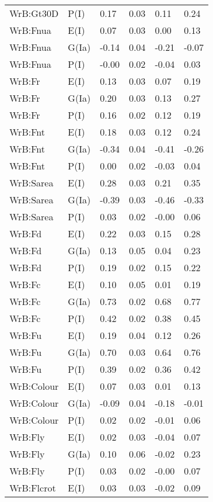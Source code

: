 \begin{center}
\begin{longtable}{|p{1.1in}|p{0.7in}|p{0.7in}|p{0.6in}|p{0.6in}|p{0.6in}|}
  WrB:Gt30D & P(I) & 0.17 & 0.03 & 0.11 & 0.24 \\ 
  WrB:Fnua & E(I) & 0.07 & 0.03 & 0.00 & 0.13 \\ 
  WrB:Fnua & G(Ia) & -0.14 & 0.04 & -0.21 & -0.07 \\ 
  WrB:Fnua & P(I) & -0.00 & 0.02 & -0.04 & 0.03 \\ 
  WrB:Fr & E(I) & 0.13 & 0.03 & 0.07 & 0.19 \\ 
  WrB:Fr & G(Ia) & 0.20 & 0.03 & 0.13 & 0.27 \\ 
  WrB:Fr & P(I) & 0.16 & 0.02 & 0.12 & 0.19 \\ 
  WrB:Fnt & E(I) & 0.18 & 0.03 & 0.12 & 0.24 \\ 
  WrB:Fnt & G(Ia) & -0.34 & 0.04 & -0.41 & -0.26 \\ 
  WrB:Fnt & P(I) & 0.00 & 0.02 & -0.03 & 0.04 \\ 
  WrB:Sarea & E(I) & 0.28 & 0.03 & 0.21 & 0.35 \\ 
  WrB:Sarea & G(Ia) & -0.39 & 0.03 & -0.46 & -0.33 \\ 
  WrB:Sarea & P(I) & 0.03 & 0.02 & -0.00 & 0.06 \\ 
  WrB:Fd & E(I) & 0.22 & 0.03 & 0.15 & 0.28 \\ 
  WrB:Fd & G(Ia) & 0.13 & 0.05 & 0.04 & 0.23 \\ 
  WrB:Fd & P(I) & 0.19 & 0.02 & 0.15 & 0.22 \\ 
  WrB:Fc & E(I) & 0.10 & 0.05 & 0.01 & 0.19 \\ 
  WrB:Fc & G(Ia) & 0.73 & 0.02 & 0.68 & 0.77 \\ 
  WrB:Fc & P(I) & 0.42 & 0.02 & 0.38 & 0.45 \\ 
  WrB:Fu & E(I) & 0.19 & 0.04 & 0.12 & 0.26 \\ 
  WrB:Fu & G(Ia) & 0.70 & 0.03 & 0.64 & 0.76 \\ 
  WrB:Fu & P(I) & 0.39 & 0.02 & 0.36 & 0.42 \\ 
  WrB:Colour & E(I) & 0.07 & 0.03 & 0.01 & 0.13 \\ 
  WrB:Colour & G(Ia) & -0.09 & 0.04 & -0.18 & -0.01 \\ 
  WrB:Colour & P(I) & 0.02 & 0.02 & -0.01 & 0.06 \\ 
  WrB:Fly & E(I) & 0.02 & 0.03 & -0.04 & 0.07 \\ 
  WrB:Fly & G(Ia) & 0.10 & 0.06 & -0.02 & 0.23 \\ 
  WrB:Fly & P(I) & 0.03 & 0.02 & -0.00 & 0.07 \\ 
  WrB:Flcrot & E(I) & 0.03 & 0.03 & -0.02 & 0.09 \\ 

\end{longtable}
\end{center}
